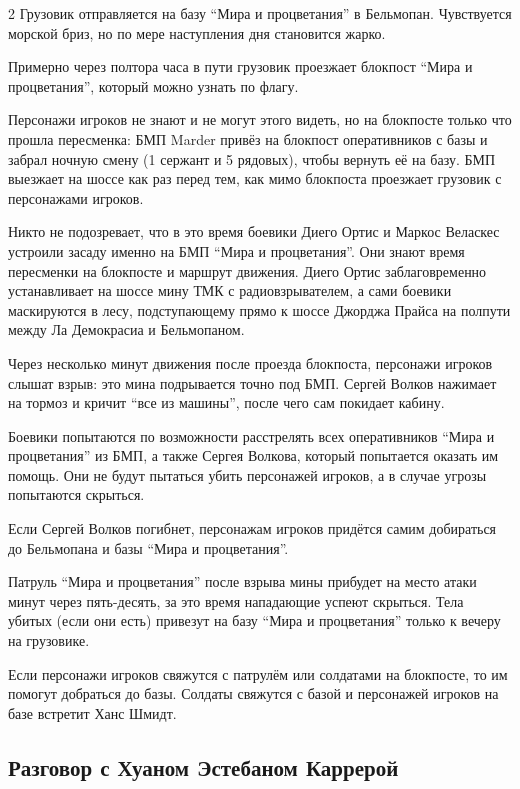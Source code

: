 \documentclass[twoside]{article}
\begin{document}
\begin{multicols}{2}
Грузовик отправляется на базу \enquote{Мира и процветания} в Бельмопан.
Чувствуется морской бриз, но по мере наступления дня становится жарко.

Примерно через полтора часа в пути грузовик проезжает блокпост \enquote{Мира и
процветания}, который можно узнать по флагу.

Персонажи игроков не знают и не могут этого видеть, но на блокпосте
только что прошла пересменка: БМП Marder привёз на блокпост
оперативников с базы и забрал ночную смену (1 сержант и 5 рядовых),
чтобы вернуть её на базу. БМП выезжает на шоссе как раз перед тем, как
мимо блокпоста проезжает грузовик с персонажами игроков.

Никто не подозревает, что в это время боевики Диего Ортис и Маркос
Веласкес устроили засаду именно на БМП \enquote{Мира и процветания}. Они знают
время пересменки на блокпосте и маршрут движения. Диего Ортис
заблаговременно устанавливает на шоссе мину ТМК с радиовзрывателем, а
сами боевики маскируются в лесу, подступающему прямо к шоссе Джорджа
Прайса на полпути между Ла Демокрасиа и Бельмопаном.

Через несколько минут движения после проезда блокпоста, персонажи
игроков слышат взрыв: это мина подрывается точно под БМП. Сергей Волков
нажимает на тормоз и кричит \enquote{все из машины}, после чего сам покидает
кабину.

Боевики попытаются по возможности расстрелять всех оперативников \enquote{Мира и
процветания} из БМП, а также Сергея Волкова, который попытается оказать
им помощь. Они не будут пытаться убить персонажей игроков, а в случае
угрозы попытаются скрыться.

Если Сергей Волков погибнет, персонажам игроков придётся самим
добираться до Бельмопана и базы \enquote{Мира и процветания}.

Патруль \enquote{Мира и процветания} после взрыва мины прибудет на место атаки
минут через пять-десять, за это время нападающие успеют скрыться. Тела
убитых (если они есть) привезут на базу \enquote{Мира и процветания} только к
вечеру на грузовике.

Если персонажи игроков свяжутся с патрулём или солдатами на блокпосте,
то им помогут добраться до базы. Солдаты свяжутся с базой и персонажей
игроков на базе встретит Ханс Шмидт.

\subsection{Разговор с Хуаном Эстебаном Каррерой}\label{carrera-meeting}


\end{multicols}
\end{document}
